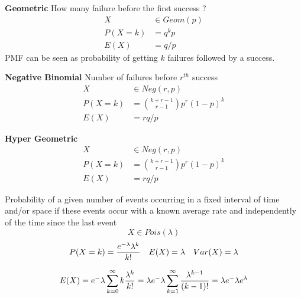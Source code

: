 \begin{slidemaximus} 
\begin{minipage}[t]{0.3\textwidth}
\par
\noindent
\textbf{Geometric}
\newline
 {\noindent How many failure before the first success ?\hfill}
\begin{align*}
    X &\in Geom(p)\\
    P(X=k) &= q^kp\\
    E(X)&= q/p
\end{align*}
PMF can be seen as probability of getting $k$ failures followed by a success. 
\vspace{5cm}
\end{minipage}
\hfill
\begin{minipage}[t]{0.3\textwidth}
\par
\noindent
\textbf{Negative Binomial}
\newline
 {\noindent Number of failures before $r^{th}$ success}
 \begin{align*}
    X &\in Neg(r,p)\\
    P(X=k) &= {k+r-1 \choose r-1}p^r(1-p)^k\\
    E(X)&= rq/p
 \end{align*}
\end{minipage}
\hfill
\begin{minipage}[t]{0.3\textwidth}
\par
\noindent
\textbf{Hyper Geometric}
 \begin{align*}
    X &\in Neg(r,p)\\
    P(X=k) &= {k+r-1 \choose r-1}p^r(1-p)^k\\
    E(X)&= rq/p
 \end{align*}
\end{minipage}


\end{slidemaximus}

\begin{slide} 
  \begin{shaded}
{\noindent
Probability of a given number of events occurring in a fixed interval of time and/or space if these events occur with a known average rate and independently of the time since the last event
}
    $$X \in Pois(\lambda)$$
    $$
    P(X=k) = {e^{-\lambda} \lambda^k \over k!} 
    \quad 
    E(X)= \lambda
    \quad
    Var(X)= \lambda
    $$
  \end{shaded}
$$E(X) = e^-\lambda\sum_{k=0}^{\infty}k {\lambda^k \over k!}
 =\lambda e^-\lambda\sum_{k=1}^{\infty}{\lambda^{k-1} \over (k-1)!}
 = \lambda e^-\lambda e^\lambda
$$
\end{slide}

